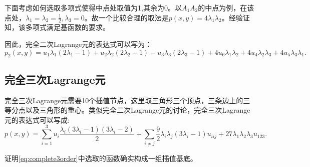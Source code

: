 下面考虑如何选取多项式使得中点处取值为1,其余为0。以$A_{1}A_{2}$的中点为例，在该点处，$\lambda_{1}=\lambda_{2}=\frac{1}{2},\lambda_{3}=0$。故一个比较合理的取法是$p(x,y)=4\lambda_{1}\lambda_{2}$。经验证知，该多项式满足基函数的要求。

因此，完全二次Lagrange元的表达式可以写为：
\begin{equation}
    p_{2}(x,y)=u_{1}\lambda_{1}(2\lambda_{1}-1)+u_{2}\lambda_{2}(2\lambda_{2}-1)+u_{3}\lambda_{3}(2\lambda_{3}-1)+4u_{6}\lambda_{1}\lambda_{2}+4u_{4}\lambda_{2}\lambda_{3}+4u_{5}\lambda_{3}\lambda_{1}.
\end{equation}
\subsection{完全三次Lagrange元}
完全三次Lagrange元需要10个插值节点，这里取三角形三个顶点，三条边上的三等分点以及三角形的重心。类似完全二次Lagrange元的讨论，完全三次Lagrange元的表达式可以写成:
\begin{equation}
    \label{eq:complete3order}
    p(x,y)=\sum_{i=1}^{3}u_{i}\frac{\lambda_{i}(3\lambda_{i}-1)(3\lambda_{i}-2)}{2}+\sum_{i\neq j}\frac{9}{2}\lambda_{i}\lambda_{j}(3\lambda_{i}-1)u_{iij}+27\lambda_{1}\lambda_{2}\lambda_{3}u_{123}.
\end{equation}
\begin{exercise}
    证明\eqref{eq:complete3order}中选取的函数确实构成一组插值基底。
\end{exercise}